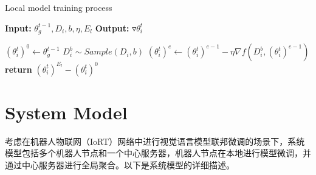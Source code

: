 \documentclass[lettersize,journal]{IEEEtran}
\begin{document}
\begin{algorithm}
\caption{Local model training process}
\label{alg:local_update}
\begin{algorithmic}[1]
\State \textbf{Input:} $\theta_g^{t-1}, D_i, b, \eta, E_l$ 
\State \textbf{Output:} $\triangledown \theta_i^t$ 

\State $(\theta_i^{t})^0 \gets \theta_g^{t-1}$ 
    \State $D_i^b \sim Sample(D_i, b)$ 
    \State $(\theta_i^{t})^e \gets (\theta_i^{t})^{e-1} - \eta \nabla f(D_i^b, (\theta_i^{t})^{e-1})$
\EndFor
\State \textbf{return} $(\theta_i^{t})^{E_l} - (\theta_i^{t})^0$
\end{algorithmic}
\end{algorithm}

\section{System Model}

考虑在机器人物联网（IoRT）网络中进行视觉语言模型联邦微调的场景下，系统模型包括多个机器人节点和一个中心服务器，机器人节点在本地进行模型微调，并通过中心服务器进行全局聚合。以下是系统模型的详细描述。
\end{document}
